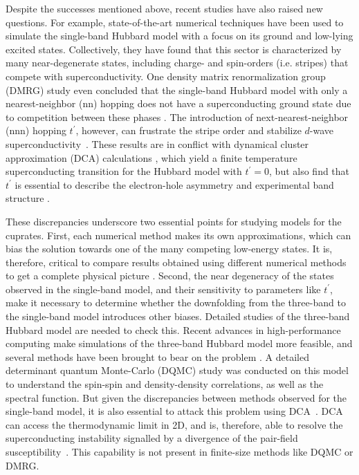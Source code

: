 \documentclass[reprint,nofootinbib,nobibnotes,amsmath,amssymb,aps,prb,floatfix]{revtex4-1}
\begin{document}
Despite the successes mentioned above, recent studies have also raised new questions. For example, state-of-the-art numerical techniques \cite{Zheng, Qin, JiangYF, JiangHC, Huang, LeBlancPRX} have been used to simulate the single-band Hubbard model with a focus on its ground and low-lying excited states. Collectively, they have found that this sector is characterized by many near-degenerate states, including charge- and spin-orders (i.e. stripes) that compete with superconductivity. One density matrix renormalization group (DMRG) study even concluded that the single-band Hubbard model with only a nearest-neighbor (nn) hopping does not have a superconducting ground state due to competition between these phases \cite{Qin}. The introduction of next-nearest-neighbor (nnn) hopping $t^\prime$, however, can frustrate the stripe order and stabilize $d$-wave superconductivity~\cite{JiangYF}. These results are in conflict with dynamical cluster approximation (DCA) calculations \cite{Maier1, Maier2}, which yield a finite temperature superconducting transition for the Hubbard model with $t^\prime = 0$, but also find that $t^\prime$ is essential to describe the electron-hole asymmetry \cite{Macridin} and experimental band structure \cite{Ogata}. 

These discrepancies underscore two essential points for studying models for the cuprates. First, each numerical method makes its own approximations, which can bias the solution towards one of the many competing low-energy states. It is, therefore, critical to compare results obtained using different numerical methods to get a complete physical picture \cite{LeBlancPRX}. Second, the near degeneracy of the states observed in the single-band model, and their sensitivity to parameters like $t^\prime$, make it necessary to determine whether the downfolding from the three-band to the single-band model introduces other biases. Detailed studies of the three-band Hubbard model are needed to check this.  
Recent advances in high-performance computing make simulations of the three-band Hubbard model more feasible, and several methods have been brought to bear on the problem \cite{Kung, Huang, White, Kent, Hanke,  Biborski,  Weber, Mai}. A detailed determinant quantum Monte-Carlo (DQMC) study \cite{Kung} was conducted on this model to understand the spin-spin and density-density correlations, as well as the spectral function. But given the discrepancies between methods observed for the single-band model, it is also essential to attack this problem using DCA~\cite{Maier1}. DCA can access the thermodynamic limit in 2D, and is, therefore, able to resolve the superconducting instability signalled by a divergence of the pair-field susceptibility~\cite{Maier2}. This capability is not present in finite-size methods 
like DQMC or DMRG. 
\end{document}
